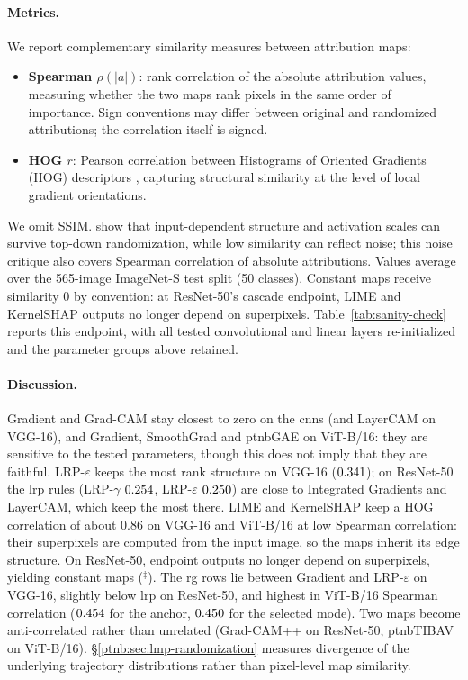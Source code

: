 \paragraph{Metrics.}
We report complementary similarity measures between attribution maps:
\begin{itemize}
    \item \textbf{Spearman $\rho(|a|)$}: rank correlation of the absolute attribution values, measuring whether the two maps rank pixels in the same order of importance. Sign conventions may differ between original and randomized attributions; the correlation itself is signed.
    \item \textbf{HOG $r$}: Pearson correlation between Histograms of Oriented Gradients (HOG) descriptors \parencite{Dalal2005hog}, capturing structural similarity at the level of local gradient orientations.
\end{itemize}
We omit SSIM. \textcite{Binder2022shortcomings} show that input-dependent structure and activation scales can survive top-down randomization, while low similarity can reflect noise; this noise critique also covers Spearman correlation of absolute attributions. Values average over the 565-image ImageNet-S test split (50 classes). Constant maps receive similarity $0$ by convention: at ResNet-50's cascade endpoint, LIME and KernelSHAP outputs no longer depend on superpixels. Table~\ref{tab:sanity-check} reports this endpoint, with all tested convolutional and linear layers re-initialized and the parameter groups above retained.

\paragraph{Discussion.}
Gradient and Grad-CAM stay closest to zero on the \acp{cnn} (and LayerCAM on VGG-16), and Gradient, SmoothGrad and \ac{ptnbGAE} on ViT-B/16: they are sensitive to the tested parameters, though this does not imply that they are faithful. LRP-$\varepsilon$ keeps the most rank structure on VGG-16 ($0.341$); on ResNet-50 the \ac{lrp} rules (LRP-$\gamma$ $0.254$, LRP-$\varepsilon$ $0.250$) are close to Integrated Gradients and LayerCAM, which keep the most there. LIME and KernelSHAP keep a HOG correlation of about $0.86$ on VGG-16 and ViT-B/16 at low Spearman correlation: their superpixels are computed from the input image, so the maps inherit its edge structure. On ResNet-50, endpoint outputs no longer depend on superpixels, yielding constant maps ($^{\ddagger}$). The \ac{rg} rows lie between Gradient and LRP-$\varepsilon$ on VGG-16, slightly below \ac{lrp} on ResNet-50, and highest in ViT-B/16 Spearman correlation ($0.454$ for the anchor, $0.450$ for the selected mode). Two maps become anti-correlated rather than unrelated (Grad-CAM++ on ResNet-50, \ac{ptnbTIBAV} on ViT-B/16). \S\ref{ptnb:sec:lmp-randomization} measures divergence of the underlying trajectory distributions rather than pixel-level map similarity.

